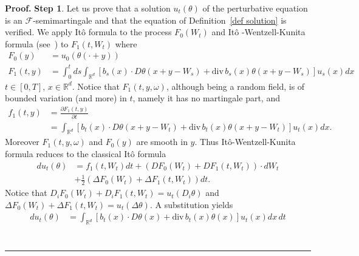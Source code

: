 \documentclass[a4paper,11pt]{article}
\newenvironment{proof}[1][Proof]{\textbf{#1.} }{\ \rule{0.5em}{0.5em}}
\begin{document}
\begin{proof}
\textbf{Step 1}. Let us prove that a solution $u_{t}\left( \theta \right) $
of the perturbative equation is an $\mathcal{F}$-semimartingale and that
the equation of Definition~\ref{def solution} is verified. We apply It\^{o}
formula to the process $F_{0}\left( W_{t}\right) $ and It\^{o}%
-Wentzell-Kunita formula (see~\cite{K}) to $F_{1}\left( t,W_{t}\right) $
where
\begin{align*}
F_{0}\left( y\right) & =u_{0}\left( \theta \left( \cdot +y\right) \right)  \\
F_{1}\left( t,y\right) & =\int_{0}^{t}ds\int_{\mathbb{R}^{d}}\left[
b_{s}\left( x\right) \cdot D\theta \left( x+y-W_{s}\right) +\mathrm{div}\,%
b_{s}\left( x\right) \theta \left( x+y-W_{s}\right) \right] u_{s}\left(
x\right) dx
\end{align*}
$t\in \left[ 0,T\right] $, $x\in \mathbb{R}^{d}$. Notice that $F_{1}\left(
t,y,\omega \right) $, although being a random field, is of bounded variation
(and more) in $t$, namely it has no martingale part, and
\begin{align*}
f_{1}\left( t,y\right) & =\frac{\partial F_{1}\left( t,y\right) }{\partial t%
} \\
& =\int_{\mathbb{R}^{d}}\left[ b_{t}\left( x\right) \cdot D\theta \left(
x+y-W_{t}\right) +\mathrm{div}\,b_{t}\left( x\right) \theta \left(
x+y-W_{t}\right) \right] u_{t}\left( x\right) dx.
\end{align*}
Moreover $F_{1}\left( t,y,\omega \right) $ and $F_{0}\left( y\right) $ are
smooth in $y$. Thus It\^{o}-Wentzell-Kunita formula reduces to the classical
It\^{o} formula
\begin{align*}
du_{t}\left( \theta \right) & =f_{1}\left( t,W_{t}\right) dt+\left(
DF_{0}\left( W_{t}\right) +DF_{1}\left( t,W_{t}\right) \right) \cdot dW_{t}
\\
& +\frac{1}{2}\left( \Delta F_{0}\left( W_{t}\right) +\Delta F_{1}\left(
t,W_{t}\right) \right) dt.
\end{align*}
Notice that $D_{i}F_{0}\left( W_{t}\right) +D_{i}F_{1}\left( t,W_{t}\right)
=u_{t}\left( D_{i}\theta \right) $ and $\Delta F_{0}\left( W_{t}\right)
+\Delta F_{1}\left( t,W_{t}\right) =u_{t}\left( \Delta \theta \right) $.
A substitution yields
\begin{align}
du_{t}\left( \theta \right) & =\int_{\mathbb{R}^{d}}\left[ b_{t}\left(
x\right) \cdot D\theta \left( x\right) +\mathrm{div}\,b_{t}\left( x\right)
\theta \left( x\right) \right] u_{t}\left( x\right) dx\,dt
\label{Ito-Wentzell-Kunita} \\

\end{align}
\end{proof}
\end{document}
